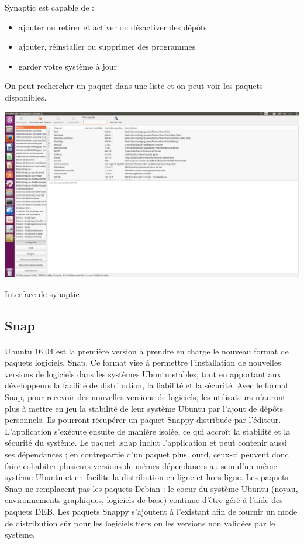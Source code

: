 \documentclass[a4paper,12pt]{article}
\begin{document}
Synaptic est capable de :
\begin{itemize}
\item ajouter ou retirer et activer ou désactiver des dépôts 
\item ajouter, réinstaller ou supprimer des programmes 
\item garder votre système à jour
\end{itemize}
On peut rechercher un paquet dans une liste et on peut voir les paquets disponibles.
\begin{center}

\includegraphics[width=1\textwidth]{synaptic.png}
\end{center}
\begin{center}
 Interface de synaptic
\end{center}


\subsection{Snap}
\paragraph{}
Ubuntu 16.04 est la première version à prendre en charge le nouveau format de paquets logiciels, Snap. Ce format vise à permettre l'installation de nouvelles versions de logiciels dans les systèmes Ubuntu stables, tout en apportant
aux développeurs la facilité de distribution, la fiabilité et la sécurité.
Avec le format Snap, pour recevoir des nouvelles versions de logiciels, les utilisateurs n'auront plus à mettre en jeu la stabilité de leur système Ubuntu par l'ajout de dépôts personnels. Ils pourront récupérer un paquet 
Snappy distribuée par l'éditeur. L'application s'exécute ensuite de manière isolée, ce qui accroît la stabilité et la sécurité du système. Le paquet .snap inclut l'application et peut contenir aussi ses dépendances ; 
en contrepartie d'un paquet plus lourd, ceux-ci peuvent donc faire cohabiter plusieurs versions de mêmes dépendances au sein d'un même système Ubuntu et en facilite la distribution en ligne et hors ligne.
Les paquets Snap ne remplacent pas les paquets Debian : le coeur du système Ubuntu (noyau, environnements graphiques, logiciels de base) continue d'être géré à l'aide des paquets DEB. 
Les paquets Snappy s'ajoutent à l'existant afin de fournir un mode de distribution sûr pour les logiciels tiers ou les versions non validées par le système.
\end{document}
